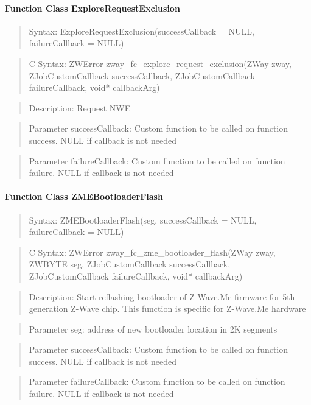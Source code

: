 \paragraph{Function Class ExploreRequestExclusion}
\begin{quote}Syntax: ExploreRequestExclusion(successCallback = NULL, failureCallback = NULL)\end{quote}
\begin{quote}C Syntax: ZWError zway\_fc\_explore\_request\_exclusion(ZWay zway, ZJobCustomCallback successCallback, ZJobCustomCallback failureCallback, void* callbackArg)\end{quote}
\begin{quote}Description: Request NWE\end{quote}
\begin{quote}Parameter successCallback: Custom function to be called on function success. NULL if callback is not needed\end{quote}
\begin{quote}Parameter failureCallback: Custom function to be called on function failure. NULL if callback is not needed\end{quote}


\paragraph{Function Class ZMEBootloaderFlash}
\begin{quote}Syntax: ZMEBootloaderFlash(seg, successCallback = NULL, failureCallback = NULL)\end{quote}
\begin{quote}C Syntax: ZWError zway\_fc\_zme\_bootloader\_flash(ZWay zway, ZWBYTE seg, ZJobCustomCallback successCallback, ZJobCustomCallback failureCallback, void* callbackArg)\end{quote}
\begin{quote}Description: Start reflashing bootloader of Z-Wave.Me firmware for 5th generation Z-Wave chip. This function is specific for Z-Wave.Me hardware\end{quote}
\begin{quote}Parameter seg: address of new bootloader location in 2K segments\end{quote}
\begin{quote}Parameter successCallback: Custom function to be called on function success. NULL if callback is not needed\end{quote}
\begin{quote}Parameter failureCallback: Custom function to be called on function failure. NULL if callback is not needed\end{quote}


